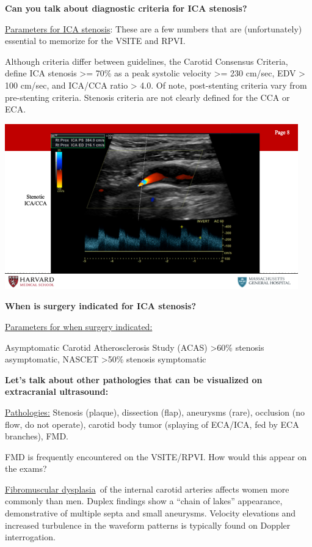 \documentclass[
]{book}
\begin{document}
\textbf{Can you talk about diagnostic criteria for ICA stenosis?}

\underline{Parameters for ICA stenosis}: These are a few numbers that are
(unfortunately) essential to memorize for the VSITE and RPVI.

Although criteria differ between guidelines, the Carotid Consensus
Criteria, define ICA stenosis \textgreater= 70\% as a peak systolic velocity \textgreater=
230 cm/sec, EDV \textgreater{} 100 cm/sec, and ICA/CCA ratio \textgreater{} 4.0. Of note,
post-stenting criteria vary from pre-stenting criteria. Stenosis
criteria are not clearly defined for the CCA or ECA.

\includegraphics[width=5in]{images/vasc_lab/Slide9}

\textbf{When is surgery indicated for ICA stenosis?}

\underline{Parameters for when surgery indicated:}

Asymptomatic Carotid Atherosclerosis Study (ACAS) \textgreater60\% stenosis
asymptomatic, NASCET \textgreater50\% stenosis symptomatic

\textbf{Let's talk about other pathologies that can be visualized on
extracranial ultrasound:}

\underline{Pathologies:} Stenosis (plaque), dissection (flap), aneurysms
(rare), occlusion (no flow, do not operate), carotid body tumor
(splaying of ECA/ICA, fed by ECA branches), FMD.

FMD is frequently encountered on the VSITE/RPVI. How would this appear
on the exams?

\underline{Fibromuscular dysplasia}~of the internal carotid arteries affects
women more commonly than men. Duplex findings show a ``chain of lakes''
appearance, demonstrative of multiple septa and small aneurysms.
Velocity elevations and increased turbulence in the waveform patterns is
typically found on Doppler interrogation.
\end{document}
